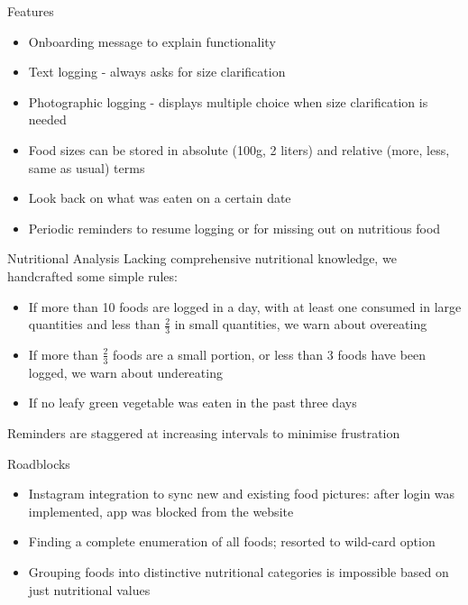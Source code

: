 \documentclass[landscape]{infslides}
\begin{document}
\begin{slide}{Features}
    \begin{itemize}
        \item Onboarding message to explain functionality
        \item Text logging - always asks for size clarification
        \item Photographic logging - displays multiple choice when size clarification is needed 
        \item Food sizes can be stored in absolute (100g, 2 liters) and relative (more, less, same as usual) terms
        \item Look back on what was eaten on a certain date
        \item Periodic reminders to resume logging or for missing out on nutritious food
    \end{itemize}
\end{slide}
\begin{slide}{Nutritional Analysis}
Lacking comprehensive nutritional knowledge, we handcrafted some simple rules:
    \begin{itemize}
        \item If more than 10 foods are logged in a day, with at least one consumed in large quantities and less than $\frac{2}{3}$ in small quantities, we warn about overeating
        \item If more than $\frac{2}{3}$ foods are a small portion, or less than 3 foods have been logged, we warn about undereating
        \item If no leafy green vegetable was eaten in the past three days
    \end{itemize}
    Reminders are staggered at increasing intervals to minimise frustration
\end{slide}
\begin{slide}{Roadblocks}
    \begin{itemize} 
        \item Instagram integration to sync new and existing food pictures: after login was implemented, app was blocked from the website
        \item Finding a complete enumeration of all foods; resorted to wild-card option
        \item Grouping foods into distinctive nutritional categories is impossible based on just nutritional values
    \end{itemize}
\end{slide}
\end{document}
